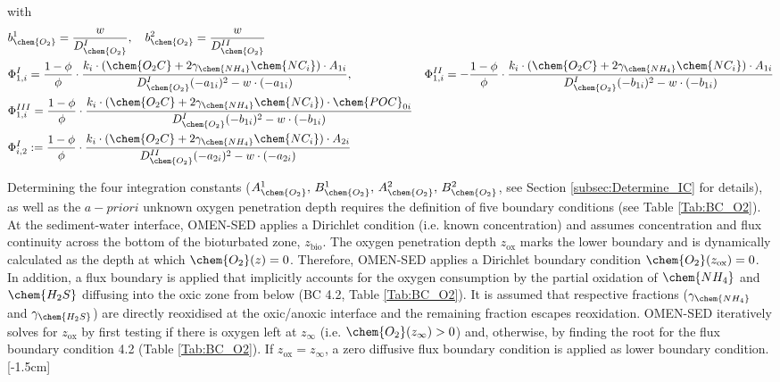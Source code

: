 \documentclass[gmd, manuscript]{copernicus}
\begin{document}
with 
\begin{align}
&b_{\chem{O_2}}^1 = \frac{w}{D_{\chem{O_2}}^{I}}, \quad b_{\chem{O_2}}^2 = \frac{w}{D_{\chem{O_2}}^{II}}\notag\\
&\Phi_{1,i}^I = \frac{1-\phi}{\phi}\cdot\frac{k_i\cdot(\chem{O_2C}+2 \gamma_{\chem{NH_4}} \chem{NC_i})\cdot A_{1i}}{D_{\chem{O_2}}^{I}(-a_{1i})^2-w\cdot (-a_{1i})}, &\Phi_{1,i}^{II} = - \frac{1-\phi}{\phi}\cdot\frac{k_i\cdot(\chem{O_2C}+2 \gamma_{\chem{NH_4}} \chem{NC_i})\cdot A_{1i}}{D_{\chem{O_2}}^{I}(-b_{1i})^2-w\cdot (-b_{1i})}\notag\\
&\Phi_{1,i}^{III} = \frac{1-\phi}{\phi}\cdot\frac{k_i\cdot(\chem{O_2C}+2 \gamma_{\chem{NH_4}} \chem{NC_i})\cdot \chem{POC}_{0i}}{D_{\chem{O_2}}^{I}(-b_{1i})^2-w\cdot (-b_{1i})} \notag\\
&\Phi_{i,2}^I := \frac{1-\phi}{\phi}\cdot\frac{k_i\cdot(\chem{O_2C}+2 \gamma_{\chem{NH_4}} \chem{NC_i})\cdot A_{2i}}{D_{\chem{O_2}}^{II}(-a_{2i})^2-w\cdot (-a_{2i})} \notag
\end{align}

Determining the four integration constants ($A_{\chem{O_2}}^1,\, B_{\chem{O_2}}^1,\, A_{\chem{O_2}}^2,\, B_{\chem{O_2}}^2$, see Section \ref{subsec:Determine_IC} for details), as well as the $a-priori$ unknown oxygen penetration 
depth requires the definition of five boundary conditions (see Table \ref{Tab:BC_O2}). 
At the sediment-water interface, OMEN-SED applies a Dirichlet condition (i.e. known concentration) and assumes concentration and flux continuity across the bottom of the bioturbated zone, $z_{\mathrm{bio}}$. 
The oxygen penetration depth $z_{\mathrm{ox}}$ marks the lower boundary and is dynamically calculated as the depth at which $\chem{O_2}(z)=0$. 
Therefore, OMEN-SED applies a Dirichlet boundary condition $\chem{O_2}(z_{\mathrm{ox}})=0$. In addition, a flux boundary is applied that implicitly accounts for the oxygen consumption by the partial oxidation 
of $\chem{NH_4}$ and $\chem{H_2S}$ diffusing into the oxic zone from below (BC 4.2, Table \ref{Tab:BC_O2}). It is assumed that respective fractions ($\gamma_{\chem{NH_4}}$ and $\gamma_{\chem{H_2S}}$) are directly reoxidised 
at the oxic/anoxic interface and the remaining fraction escapes reoxidation. OMEN-SED iteratively solves for $z_{\mathrm{ox}}$ by first testing if there is oxygen left at $z_\infty$ (i.e. $\chem{O_2}(z_\infty) > 0$) and, otherwise, by finding the root for the flux 
boundary condition 4.2 (Table \ref{Tab:BC_O2}). If $z_{\mathrm{ox}}=z_\infty$,  a zero diffusive flux boundary condition is applied as lower boundary condition. 
[-1.5cm]%
\end{document}
